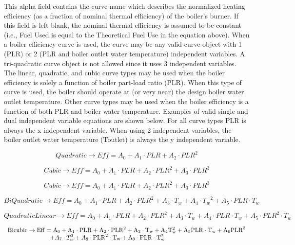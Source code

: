 This alpha field contains the curve name which describes the normalized heating efficiency (as a fraction of nominal thermal efficiency) of the boiler's burner. If this field is left blank, the nominal thermal efficiency is assumed to be constant (i.e., Fuel Used is equal to the Theoretical Fuel Use in the equation above). When a boiler efficiency curve is used, the curve may be any valid curve object with 1 (PLR) or 2 (PLR and boiler outlet water temperature) independent variables. A tri-quadratic curve object is not allowed since it uses 3 independent variables. The linear, quadratic, and cubic curve types may be used when the boiler efficiency is solely a function of boiler part-load ratio (PLR). When this type of curve is used, the boiler should operate at (or very near) the design boiler water outlet temperature. Other curve types may be used when the boiler efficiency is a function of both PLR and boiler water temperature. Examples of valid single and dual independent variable equations are shown below. For all curve types PLR is always the x independent variable. When using 2 independent variables, the boiler outlet water temperature (Toutlet) is always the y independent variable.

\begin{equation}
    Quadratic \to Eff = {A_0} + {A_1}\cdot PLR + {A_2}\cdot PL{R^2}
\end{equation}

\begin{equation}
    Cubic \to Eff = {A_0} + {A_1}\cdot PLR + {A_2}\cdot PL{R^2} + {A_3}\cdot PL{R^3}
\end{equation}

\begin{equation}
    Cubic \to Eff = {A_0} + {A_1}\cdot PLR + {A_2}\cdot PL{R^2} + {A_3}\cdot PL{R^3}
\end{equation}

\begin{equation}
    BiQuadratic \to Eff = {A_0} + {A_1}\cdot PLR + {A_2}\cdot PL{R^2} + {A_3}\cdot {T_w} + {A_4}\cdot {T_w}^2 + {A_5}\cdot PLR\cdot {T_w}
\end{equation}

\begin{equation}
    QuadraticLinear \to Eff = {A_0} + {A_1}\cdot PLR + {A_2}\cdot PL{R^2} + {A_3}\cdot {T_w} + {A_4}\cdot PLR\cdot {T_w} + {A_5}\cdot PL{R^2}\cdot {T_w}
\end{equation}

\begin{equation}
    \begin{array}{l}
        \rm{Bicubic} \to \rm{Eff} = A_0 + A_1 \cdot \rm{PLR} + A_2 \cdot \rm{PLR}^2 + A_3 \cdot T_w + A_4 T_w^2 + A_5 \rm{PLR} \cdot T_w + A_6 \rm{PLR}^3 \\
        \quad \quad \quad \quad \quad \quad \quad  + A_7 \cdot T_w^3 + A_8 \cdot \rm{PLR}^2 \cdot T_w + A_9 \cdot \rm{PLR} \cdot T_w^2
    \end{array}
\end{equation}

